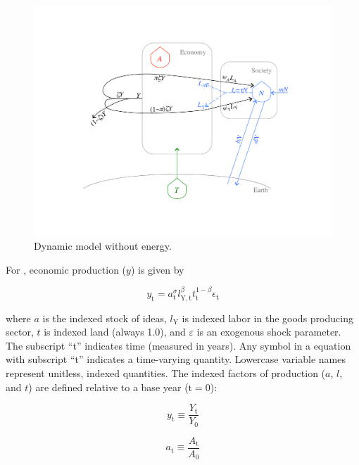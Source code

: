 \documentclass[letterpaper,12pt]{article}
\begin{document}
\begin{figure} \label{fig:ModelWithoutEnergy}
  \begin{center}
    \includegraphics[width=\textwidth]{figure_other/ModelWithoutEnergy.pdf}
    \caption{Dynamic model without energy.}
  \end{center}
\end{figure}

For \citet{Jones:2001wn}, economic production ($y$) is given by

\begin{equation} \label{eq:Jones_production_function}
	y_\mathrm{t} = a_\mathrm{t} ^\sigma l_\mathrm{Y,t} ^\beta t_\mathrm{t} ^{1-\beta} \epsilon_\mathrm{t}
\end{equation}

\noindent where $a$ is the indexed stock of ideas, $l_\mathrm{Y}$ is indexed labor in the goods producing sector, $t$ is indexed land (always 1.0), and $\varepsilon$ is an exogenous shock parameter. The subscript ``t'' indicates time (measured in years). Any symbol in a equation with subscript ``$\mathrm{t}$'' indicates a time-varying quantity. Lowercase variable names represent unitless, indexed quantities. The indexed factors of production ($a$, $l$, and $t$) are defined relative to a base year ($\mathrm{t} = 0$):

\begin{equation} \label{eq:index_y}
	y_\mathrm{t} \equiv \frac{Y_\mathrm{t}}{Y_\mathrm{0}}
\end{equation}

\begin{equation} \label{eq:index_a}
	a_\mathrm{t} \equiv \frac{A_\mathrm{t}}{A_\mathrm{0}}
\end{equation}
\end{document}
